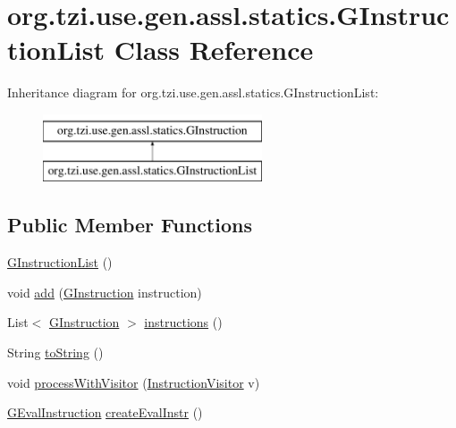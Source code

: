\hypertarget{classorg_1_1tzi_1_1use_1_1gen_1_1assl_1_1statics_1_1_g_instruction_list}{\section{org.\-tzi.\-use.\-gen.\-assl.\-statics.\-G\-Instruction\-List Class Reference}
\label{classorg_1_1tzi_1_1use_1_1gen_1_1assl_1_1statics_1_1_g_instruction_list}
}
Inheritance diagram for org.\-tzi.\-use.\-gen.\-assl.\-statics.\-G\-Instruction\-List\-:\begin{figure}[H]
\begin{center}
\leavevmode
\includegraphics[height=2.000000cm]{classorg_1_1tzi_1_1use_1_1gen_1_1assl_1_1statics_1_1_g_instruction_list}
\end{center}
\end{figure}
\subsection*{Public Member Functions}
\begin{DoxyCompactItemize}
\item 
\hyperlink{classorg_1_1tzi_1_1use_1_1gen_1_1assl_1_1statics_1_1_g_instruction_list_a1eb632e75c9a2d445b03a48dfda8bbe7}{G\-Instruction\-List} ()
\item 
void \hyperlink{classorg_1_1tzi_1_1use_1_1gen_1_1assl_1_1statics_1_1_g_instruction_list_a87366df608b82cca660eef9ea94b2064}{add} (\hyperlink{interfaceorg_1_1tzi_1_1use_1_1gen_1_1assl_1_1statics_1_1_g_instruction}{G\-Instruction} instruction)
\item 
List$<$ \hyperlink{interfaceorg_1_1tzi_1_1use_1_1gen_1_1assl_1_1statics_1_1_g_instruction}{G\-Instruction} $>$ \hyperlink{classorg_1_1tzi_1_1use_1_1gen_1_1assl_1_1statics_1_1_g_instruction_list_a564aef850d037d2ab0fbe6fe9d03ebc6}{instructions} ()
\item 
String \hyperlink{classorg_1_1tzi_1_1use_1_1gen_1_1assl_1_1statics_1_1_g_instruction_list_a735a7f52d08dc6def95d861a65ec3eae}{to\-String} ()
\item 
void \hyperlink{classorg_1_1tzi_1_1use_1_1gen_1_1assl_1_1statics_1_1_g_instruction_list_a3b5c03c375206d5df56a830f8579a6cf}{process\-With\-Visitor} (\hyperlink{interfaceorg_1_1tzi_1_1use_1_1gen_1_1assl_1_1statics_1_1_instruction_visitor}{Instruction\-Visitor} v)
\item 
\hyperlink{classorg_1_1tzi_1_1use_1_1gen_1_1assl_1_1dynamics_1_1_g_eval_instruction}{G\-Eval\-Instruction} \hyperlink{classorg_1_1tzi_1_1use_1_1gen_1_1assl_1_1statics_1_1_g_instruction_list_a621c1248c7623b5538d316f458bde085}{create\-Eval\-Instr} ()
\end{DoxyCompactItemize}


